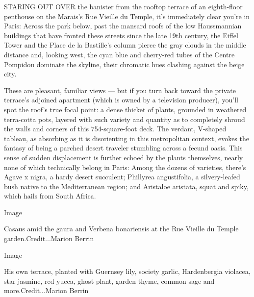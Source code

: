 STARING OUT OVER the banister from the rooftop terrace of an
eighth-floor penthouse on the Marais's Rue Vieille du Temple, it's
immediately clear you're in Paris: Across the park below, past the
mansard roofs of the low Haussmannian buildings that have fronted these
streets since the late 19th century, the Eiffel Tower and the Place de
la Bastille's column pierce the gray clouds in the middle distance and,
looking west, the cyan blue and cherry-red tubes of the Centre Pompidou
dominate the skyline, their chromatic hues clashing against the beige
city.

These are pleasant, familiar views --- but if you turn back toward the
private terrace's adjoined apartment (which is owned by a television
producer), you'll spot the roof's true focal point: a dense thicket of
plants, grounded in weathered terra-cotta pots, layered with such
variety and quantity as to completely shroud the walls and corners of
this 754-square-foot deck. The verdant, V-shaped tableau, as absorbing
as it is disorienting in this metropolitan context, evokes the fantasy
of being a parched desert traveler stumbling across a fecund oasis. This
sense of sudden displacement is further echoed by the plants themselves,
nearly none of which technically belong in Paris: Among the dozens of
varieties, there's Agave x nigra, a hardy desert succulent; Phillyrea
angustifolia, a silvery-leafed bush native to the Mediterranean region;
and Aristaloe aristata, squat and spiky, which hails from South Africa.

Image

Casaus amid the gaura and Verbena bonariensis at the Rue Vieille du
Temple garden.Credit...Marion Berrin

Image

His own terrace, planted with Guernsey lily, society garlic,
Hardenbergia violacea, star jasmine, red yucca, ghost plant, garden
thyme, common sage and more.Credit...Marion Berrin

